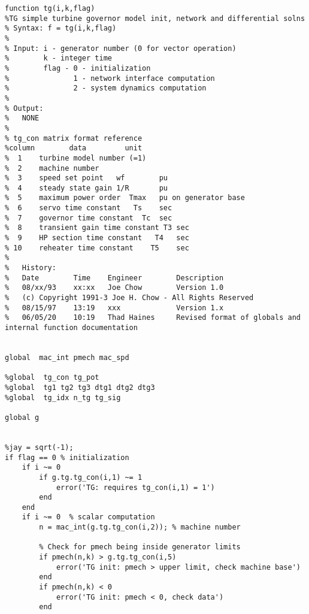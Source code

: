 \documentclass[12pt]{article}
\begin{document}



\begin{verbatim}
function tg(i,k,flag)
%TG simple turbine governor model init, network and differential solns
% Syntax: f = tg(i,k,flag)
%
% Input: i - generator number (0 for vector operation)
%        k - integer time
%        flag - 0 - initialization
%               1 - network interface computation
%               2 - system dynamics computation
%
% Output: 
%   NONE
%
% tg_con matrix format reference
%column	       data			unit
%  1	turbine model number (=1)
%  2	machine number
%  3	speed set point   wf		pu
%  4	steady state gain 1/R		pu
%  5	maximum power order  Tmax	pu on generator base
%  6	servo time constant   Ts	sec
%  7	governor time constant  Tc	sec
%  8	transient gain time constant T3	sec
%  9	HP section time constant   T4	sec
% 10	reheater time constant    T5	sec
%
%   History:
%   Date        Time    Engineer        Description
%   08/xx/93    xx:xx   Joe Chow        Version 1.0
%   (c) Copyright 1991-3 Joe H. Chow - All Rights Reserved
%   08/15/97    13:19   xxx             Version 1.x
%   06/05/20    10:19   Thad Haines     Revised format of globals and internal function documentation


global  mac_int pmech mac_spd

%global  tg_con tg_pot
%global  tg1 tg2 tg3 dtg1 dtg2 dtg3
%global  tg_idx n_tg tg_sig

global g


%jay = sqrt(-1);
if flag == 0 % initialization
    if i ~= 0
        if g.tg.tg_con(i,1) ~= 1
            error('TG: requires tg_con(i,1) = 1')
        end
    end
    if i ~= 0  % scalar computation
        n = mac_int(g.tg.tg_con(i,2)); % machine number
        
        % Check for pmech being inside generator limits
        if pmech(n,k) > g.tg.tg_con(i,5)
            error('TG init: pmech > upper limit, check machine base')
        end
        if pmech(n,k) < 0
            error('TG init: pmech < 0, check data')
        end
        

\end{verbatim}
\end{document}
